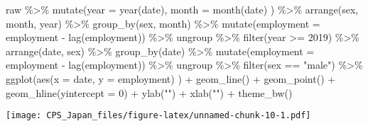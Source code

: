 \documentclass[
]{book}
\newenvironment{Shaded}{\begin{snugshade}}{\end{snugshade}}
\newcommand{\AttributeTok}[1]{\textcolor[rgb]{0.77,0.63,0.00}{#1}}
\newcommand{\DecValTok}[1]{\textcolor[rgb]{0.00,0.00,0.81}{#1}}
\newcommand{\FunctionTok}[1]{\textcolor[rgb]{0.00,0.00,0.00}{#1}}
\newcommand{\NormalTok}[1]{#1}
\newcommand{\SpecialCharTok}[1]{\textcolor[rgb]{0.00,0.00,0.00}{#1}}
\newcommand{\StringTok}[1]{\textcolor[rgb]{0.31,0.60,0.02}{#1}}
\begin{document}
\begin{Shaded}
\begin{Highlighting}[]
\NormalTok{raw }\SpecialCharTok{\%\textgreater{}\%}
  \FunctionTok{mutate}\NormalTok{(}\AttributeTok{year =} \FunctionTok{year}\NormalTok{(date),}
         \AttributeTok{month =} \FunctionTok{month}\NormalTok{(date)}
\NormalTok{         ) }\SpecialCharTok{\%\textgreater{}\%}
  \FunctionTok{arrange}\NormalTok{(sex,}
\NormalTok{          month,}
\NormalTok{          year) }\SpecialCharTok{\%\textgreater{}\%}
  \FunctionTok{group\_by}\NormalTok{(sex,}
\NormalTok{           month) }\SpecialCharTok{\%\textgreater{}\%}
  \FunctionTok{mutate}\NormalTok{(}\AttributeTok{employment =}\NormalTok{ employment }\SpecialCharTok{{-}} \FunctionTok{lag}\NormalTok{(employment)) }\SpecialCharTok{\%\textgreater{}\%}
\NormalTok{  ungroup }\SpecialCharTok{\%\textgreater{}\%}
  \FunctionTok{filter}\NormalTok{(year }\SpecialCharTok{\textgreater{}=} \DecValTok{2019}\NormalTok{) }\SpecialCharTok{\%\textgreater{}\%}
  \FunctionTok{arrange}\NormalTok{(date,}
\NormalTok{          sex) }\SpecialCharTok{\%\textgreater{}\%}
  \FunctionTok{group\_by}\NormalTok{(date) }\SpecialCharTok{\%\textgreater{}\%}
  \FunctionTok{mutate}\NormalTok{(}\AttributeTok{employment =}\NormalTok{ employment }\SpecialCharTok{{-}} \FunctionTok{lag}\NormalTok{(employment)) }\SpecialCharTok{\%\textgreater{}\%}
\NormalTok{  ungroup }\SpecialCharTok{\%\textgreater{}\%}
  \FunctionTok{filter}\NormalTok{(sex }\SpecialCharTok{==} \StringTok{"male"}\NormalTok{) }\SpecialCharTok{\%\textgreater{}\%}
  \FunctionTok{ggplot}\NormalTok{(}\FunctionTok{aes}\NormalTok{(}\AttributeTok{x =}\NormalTok{ date,}
             \AttributeTok{y =}\NormalTok{ employment)}
\NormalTok{         ) }\SpecialCharTok{+}
  \FunctionTok{geom\_line}\NormalTok{() }\SpecialCharTok{+}
  \FunctionTok{geom\_point}\NormalTok{() }\SpecialCharTok{+}
  \FunctionTok{geom\_hline}\NormalTok{(}\AttributeTok{yintercept =} \DecValTok{0}\NormalTok{) }\SpecialCharTok{+}
  \FunctionTok{ylab}\NormalTok{(}\StringTok{""}\NormalTok{) }\SpecialCharTok{+}
  \FunctionTok{xlab}\NormalTok{(}\StringTok{""}\NormalTok{) }\SpecialCharTok{+}
  \FunctionTok{theme\_bw}\NormalTok{()}
\end{Highlighting}
\end{Shaded}

\texttt{[image: CPS\_Japan\_files/figure-latex/unnamed-chunk-10-1.pdf]}

  
\end{document}
